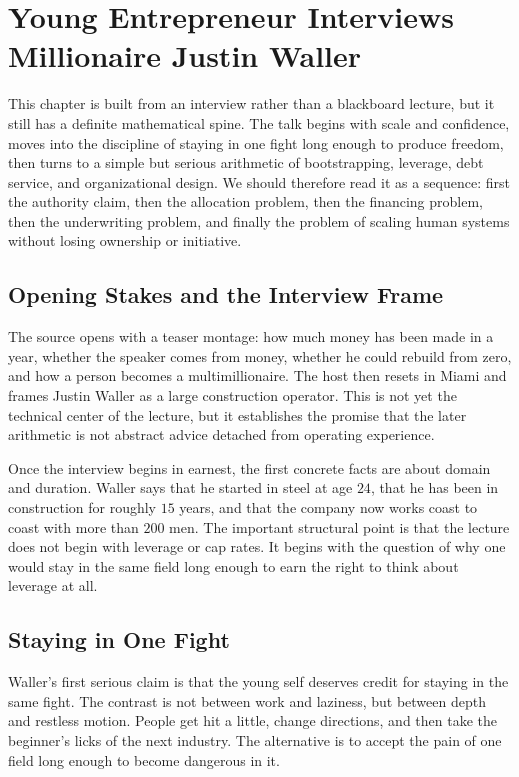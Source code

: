 \chapter{Young Entrepreneur Interviews Millionaire Justin Waller}

This chapter is built from an interview rather than a blackboard lecture, but it still has a definite mathematical spine. The talk begins with scale and confidence, moves into the discipline of staying in one fight long enough to produce freedom, then turns to a simple but serious arithmetic of bootstrapping, leverage, debt service, and organizational design. We should therefore read it as a sequence: first the authority claim, then the allocation problem, then the financing problem, then the underwriting problem, and finally the problem of scaling human systems without losing ownership or initiative.

\section{Opening Stakes and the Interview Frame}

The source opens with a teaser montage: how much money has been made in a year, whether the speaker comes from money, whether he could rebuild from zero, and how a person becomes a multimillionaire. The host then resets in Miami and frames Justin Waller as a large construction operator. This is not yet the technical center of the lecture, but it establishes the promise that the later arithmetic is not abstract advice detached from operating experience.

Once the interview begins in earnest, the first concrete facts are about domain and duration. Waller says that he started in steel at age \(24\), that he has been in construction for roughly \(15\) years, and that the company now works coast to coast with more than \(200\) men. The important structural point is that the lecture does not begin with leverage or cap rates. It begins with the question of why one would stay in the same field long enough to earn the right to think about leverage at all.

\section{Staying in One Fight}

Waller's first serious claim is that the young self deserves credit for staying in the same fight. The contrast is not between work and laziness, but between depth and restless motion. People get hit a little, change directions, and then take the beginner's licks of the next industry. The alternative is to accept the pain of one field long enough to become dangerous in it.


